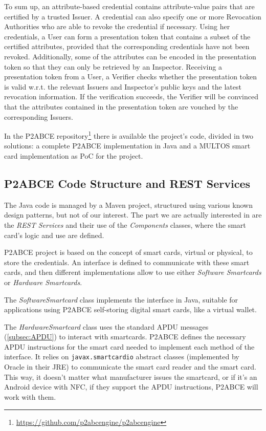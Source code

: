 To sum up, an attribute-based credential contains attribute-value pairs that are certified by a trusted Issuer. A credential can also specify one or more Revocation Authorities who are able to revoke the credential if necessary. Using her credentials, a User can form a presentation token that contains a subset of the certified attributes, provided that the corresponding credentials have not been revoked. Additionally, some of the attributes can be encoded in the presentation token so that they can only be retrieved by an Inspector. Receiving a presentation token from a User, a Verifier checks whether the presentation token is valid w.r.t. the relevant Issuers and Inspector's public keys and the latest revocation information. If the verification succeeds, the Verifier will be convinced that the attributes contained in the presentation token are vouched by the corresponding Issuers.


\hfil

In the P2ABCE repository\footnote{\url{https://github.com/p2abcengine/p2abcengine}} there is available the project's code, divided in two solutions: a complete P2ABCE implementation in Java and a MULTOS smart card implementation as PoC for the project.

\subsection{P2ABCE Code Structure and REST Services}

The Java code is managed by a Maven project, structured using various known design patterns, but not of our interest. The part we are actually interested in are the \textit{REST Services} and their use of the \textit{Components} classes, where the smart card's logic and use are defined.

P2ABCE project is based on the concept of smart cards, virtual or physical, to store the credentials. An interface is defined to communicate with these smart cards, and then different implementations allow to use either \textit{Software Smartcards} or \textit{Hardware Smartcards}. 

The \textit{SoftwareSmartcard} class implements the interface in Java, suitable for applications using P2ABCE self-storing digital smart cards, like a virtual wallet.

The \textit{HardwareSmartcard} class uses the standard APDU messages (\ref{subsec:APDU}) to interact with smartcards. P2ABCE defines the necessary APDU instructions for the smart card needed to implement each method of the interface. It relies on \texttt{javax.smartcardio} abstract classes (implemented by Oracle in their JRE) to communicate the smart card reader and the smart card. This way, it doesn't matter what manufacturer issues the smartcard, or if it's an Android device with NFC, if they support the APDU instructions, P2ABCE will work with them.

